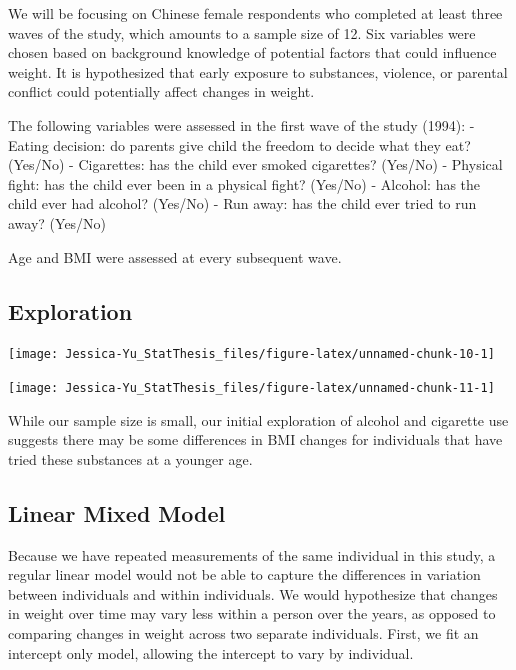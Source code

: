 \documentclass[12pt, twoside]{amherstthesis}
\begin{document}
We will be focusing on Chinese female respondents who completed at least three waves of the study, which amounts to a sample size of 12. Six variables were chosen based on background knowledge of potential factors that could influence weight. It is hypothesized that early exposure to substances, violence, or parental conflict could potentially affect changes in weight.

The following variables were assessed in the first wave of the study (1994):
- Eating decision: do parents give child the freedom to decide what they eat? (Yes/No)
- Cigarettes: has the child ever smoked cigarettes? (Yes/No)
- Physical fight: has the child ever been in a physical fight? (Yes/No)
- Alcohol: has the child ever had alcohol? (Yes/No)
- Run away: has the child ever tried to run away? (Yes/No)

Age and BMI were assessed at every subsequent wave.

\hypertarget{exploration}{%
\subsection{Exploration}\label{exploration}}
\begin{center}\texttt{[image: Jessica-Yu\_StatThesis\_files/figure-latex/unnamed-chunk-10-1]} \end{center}
\begin{center}\texttt{[image: Jessica-Yu\_StatThesis\_files/figure-latex/unnamed-chunk-11-1]} \end{center}

While our sample size is small, our initial exploration of alcohol and cigarette use suggests there may be some differences in BMI changes for individuals that have tried these substances at a younger age.

\hypertarget{linear-mixed-model}{%
\subsection{Linear Mixed Model}\label{linear-mixed-model}}

Because we have repeated measurements of the same individual in this study, a regular linear model would not be able to capture the differences in variation between individuals and within individuals. We would hypothesize that changes in weight over time may vary less within a person over the years, as opposed to comparing changes in weight across two separate individuals. First, we fit an intercept only model, allowing the intercept to vary by individual.
\end{document}
